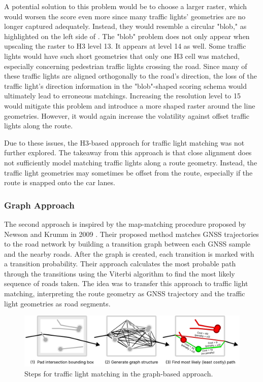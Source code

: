 A potential solution to this problem would be to choose a larger raster, which would worsen the score even more since many traffic lights' geometries are no longer captured adequately. Instead, they would resemble a circular "blob," as highlighted on the left side of . The "blob" problem does not only appear when upscaling the raster to H3 level 13. It appears at level 14 as well. Some traffic lights would have such short geometries that only one H3 cell was matched, especially concerning pedestrian traffic lights crossing the road. Since many of these traffic lights are aligned orthogonally to the road's direction, the loss of the traffic light's direction information in the "blob"-shaped scoring schema would ultimately lead to erroneous matchings. Increasing the resolution level to 15 would mitigate this problem and introduce a more shaped raster around the line geometries. However, it would again increase the volatility against offset traffic lights along the route.

Due to these issues, the H3-based approach for traffic light matching was not further explored. The takeaway from this approach is that close alignment does not sufficiently model matching traffic lights along a route geometry. Instead, the traffic light geometries may sometimes be offset from the route, especially if the route is snapped onto the car lanes.

\subsubsection{Graph Approach}

The second approach is inspired by the map-matching procedure proposed by Newson and Krumm in 2009 \cite{newson_hidden_2009}. Their proposed method matches GNSS trajectories to the road network by building a transition graph between each GNSS sample and the nearby roads. After the graph is created, each transition is marked with a transition probability. Their approach calculates the most probable path through the transitions using the Viterbi algorithm to find the most likely sequence of roads taken. The idea was to transfer this approach to traffic light matching, interpreting the route geometry as GNSS trajectory and the traffic light geometries as road segments.

\begin{figure}[t]
\centering
\includegraphics[width=\linewidth]{images/sg-selection-graph-approach.pdf}
\caption{Steps for traffic light matching in the graph-based approach.}
\label{fig:sg-selection-graph-approach}
\end{figure}


